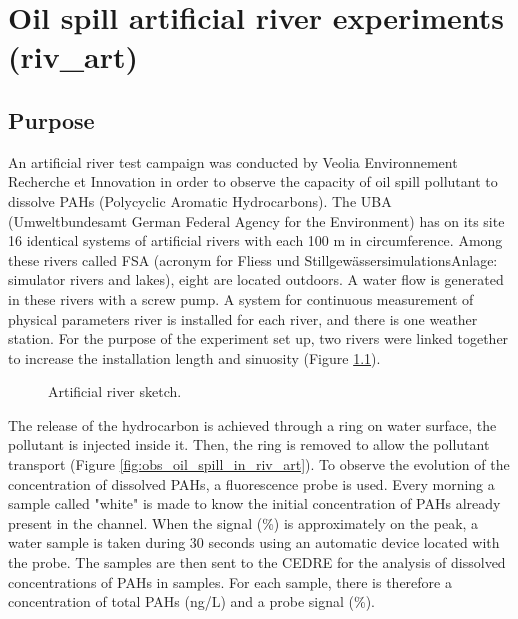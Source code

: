 \chapter{Oil spill artificial river experiments (riv\_art)}

\section{Purpose}

An artificial river test campaign was conducted by Veolia Environnement
Recherche et Innovation in order to observe the capacity of oil spill pollutant
to dissolve PAHs (Polycyclic Aromatic Hydrocarbons).
The UBA (Umweltbundesamt German Federal Agency for the Environment) has on its
site 16 identical systems of artificial rivers with each 100 m in circumference.
Among these rivers called FSA (acronym for Fliess und
StillgewässersimulationsAnlage: simulator rivers and lakes), eight are located
outdoors.
A water flow is generated in these rivers with a screw pump.
A system for continuous measurement of physical parameters river is installed
for each river, and there is one weather station.
For the purpose of the experiment set up, two rivers were linked together to
increase the installation length and sinuosity (Figure \ref{fig:riv_art}).

\begin{figure}[htbp]
  \begin{center}
  \end{center}
  \caption{Artificial river sketch.}
  \label{fig:riv_art}
\end{figure}

The release of the hydrocarbon is achieved through a ring on water surface,
the pollutant is injected inside it.
Then, the ring is removed to allow the pollutant transport
(Figure \ref{fig:obs_oil_spill_in_riv_art}).
To observe the evolution of the concentration of dissolved PAHs, a fluorescence
probe is used.
Every morning a sample called "white" is made to know the initial concentration
of PAHs already present in the channel.
When the signal (\%) is approximately on the peak, a water sample is taken
during 30 seconds using an automatic device located with the probe.
The samples are then sent to the CEDRE for the analysis of dissolved
concentrations of PAHs in samples.
For each sample, there is therefore a concentration of total PAHs (ng/L) and a
probe signal (\%).


